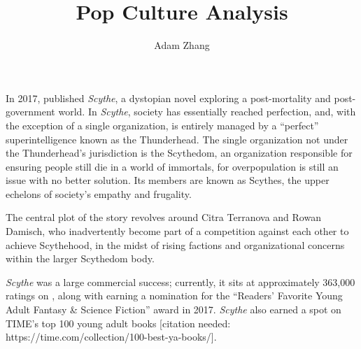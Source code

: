 \documentclass[mla8]{mla}
\title{Pop Culture Analysis}
\author{Adam Zhang}
\date{\mladate}
\newcommand{\book}{\emph{Scythe}}
\begin{document}
\begin{paper}
  In 2017, \citeauthor{Shusterman2017:Scythe} published \book, a dystopian novel
  exploring a post-mortality and post-government world. In \book, society has
  essentially reached perfection, and, with the exception of a single
  organization, is entirely managed by a ``perfect'' superintelligence known as
  the Thunderhead. The single organization not under the Thunderhead's
  jurisdiction is the Scythedom, an organization responsible for ensuring people
  still die in a world of immortals, for overpopulation is still an issue with
  no better solution. Its members are known as Scythes, the upper echelons of
  society's empathy and frugality.

  The central plot of the story revolves around Citra Terranova and Rowan
  Damisch, who inadvertently become part of a competition against each other to
  achieve Scythehood, in the midst of rising factions and organizational
  concerns within the larger Scythedom body.

  \book{} was a large commercial success; currently, it sits at approximately
  363,000 ratings on \citeauthor{Goodreads2016:Scythe}, along with earning a
  nomination for the ``Readers' Favorite Young Adult Fantasy \& Science
  Fiction'' award in 2017. \book{} also earned a spot on TIME's top 100 young
  adult books [citation needed: https://time.com/collection/100-best-ya-books/].
\end{paper}

\begin{workscited}
  \printbibliography[heading=none]
\end{workscited}
\end{document}
